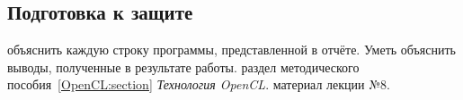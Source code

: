 \subsection{Подготовка к защите}
\begin{enumerate}
     объяснить каждую строку программы, представленной в отчёте. Уметь объяснить выводы, полученные в результате работы.
     раздел методического пособия~\ref{OpenCL:section} \textit{Технология OpenCL}.
     материал лекции №8.
\end{enumerate}